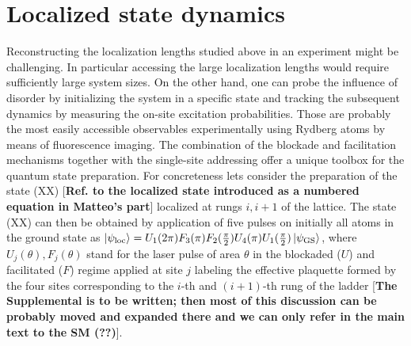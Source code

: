 \documentclass[prl,aps,twocolumn,showpacs,superscriptaddress,longbibliography]{revtex4-1}
\newcommand{\ran}{\right\rangle}
\newcommand{\ket}[1]{\left| #1 \ran}
\begin{document}
\section{Localized state dynamics}

Reconstructing the localization lengths studied above in an experiment might be challenging. In particular accessing the large localization lengths would require sufficiently large system sizes. On the other hand, one can probe the influence of disorder by initializing the system in a specific state and tracking the subsequent dynamics by measuring the on-site excitation probabilities. Those are probably the most easily accessible observables experimentally using Rydberg atoms by means of fluorescence imaging. The combination of the blockade and facilitation mechanisms together with the single-site addressing offer a unique toolbox for the quantum state preparation. For concreteness lets consider the preparation of the state (XX) [{\bf Ref. to the localized state introduced as a numbered equation in Matteo's part}] localized at rungs $i,i+1$ of the lattice. The state (XX) can then be obtained by application of five pulses on initially all atoms in the ground state as $\ket{\psi_{\rm loc}} = U_1(2 \pi) F_3(\pi) F_2(\frac{\pi}{2}) U_4(\pi) U_1(\frac{\pi}{2}) \ket{\psi_{\rm GS}}$, where $U_j(\theta),F_j(\theta)$ stand for the laser pulse of area $\theta$ in the blockaded ($U$) and facilitated ($F$) regime applied at site $j$ labeling the effective plaquette formed by the four sites corresponding to the $i$-th and $(i+1)$-th rung of the ladder \cite{SM} [{\bf The Supplemental is to be written; then most of this discussion can be probably moved and expanded there and we can only refer in the main text to the SM (??)}]. 
\end{document}
